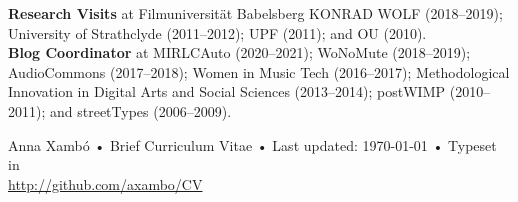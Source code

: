 \documentclass[10pt, a4paper]{article}
\begin{document}
{\textbf{Research Visits}} at Filmuniversität Babelsberg KONRAD WOLF (2018--2019); University of Strathclyde (2011--2012); UPF (2011); and OU (2010).\\

{\textbf{Blog Coordinator}} at MIRLCAuto (2020--2021); WoNoMute (2018--2019); AudioCommons (2017--2018); Women in Music Tech (2016--2017); Methodological Innovation in Digital Arts and Social Sciences (2013--2014); postWIMP (2010--2011); and streetTypes (2006--2009).


\begin{center}
{\scriptsize  Anna Xambó •\- Brief Curriculum Vitae •\- Last updated: \today\- •\- %
Typeset in \href{http://nitens.org/taraborelli/cvtex}{
\XeTeX }\\
\href{http://github.com/axambo/CV}{http://github.com/axambo/CV}}
\end{center}
\end{document}
